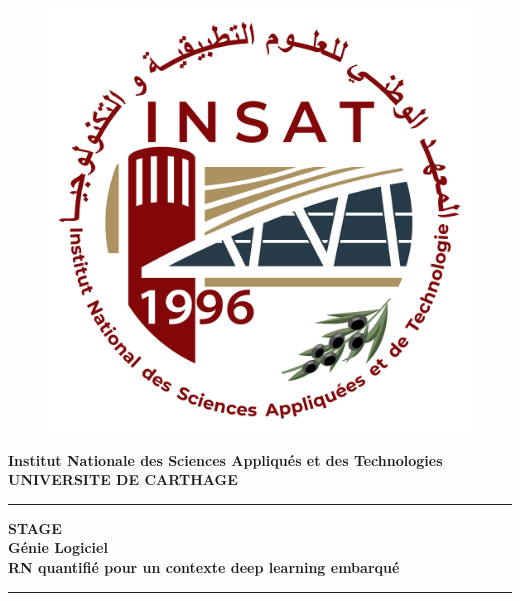 \begin{titlepage}
   \begin{center}
   \begin{doublespacing}

       \begin{figure}
       \begin{center}

        \begin{minipage}[b]{0.22\textwidth}
            \includegraphics[width=\textwidth]{images/insat.png}
        \end{minipage}
        \hfill
        \hfill
        \end{center}
        \end{figure}
       
       {\Large\textbf{Institut Nationale des Sciences Appliqués et des Technologies}\\}
       {\Large\textbf{UNIVERSITE DE CARTHAGE}\\}
       \noindent\rule{15cm}{0.4pt}
       {\Huge\textbf{STAGE}\\}
       {\large\textbf{Génie Logiciel}\\}
       {\Large\textbf{RN quantifié pour un contexte deep learning embarqué}\\}

       \vspace{10 mm}
       \vspace{2.5 mm}
       {\huge\textbf{}}
       \noindent\rule{15cm}{0.5pt}
       \vspace{10 mm}
       


\end{doublespacing}
\end{center}
\end{titlepage}
